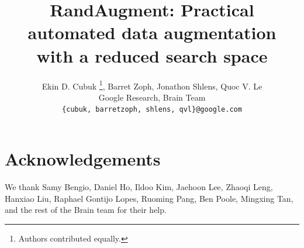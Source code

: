 \documentclass[10pt,twocolumn,letterpaper]{article}
\begin{document}
\title{RandAugment: Practical automated data augmentation\\ with a reduced search space}



\author{Ekin D. Cubuk \thanks{Authors contributed equally.}, Barret Zoph\footnotemark[1], Jonathon Shlens, Quoc V. Le  \\
Google Research, Brain Team\\
\texttt{\{cubuk, barretzoph, shlens, qvl\}@google.com}}

\maketitle








\section{Acknowledgements}
We thank Samy Bengio, Daniel Ho, Ildoo Kim, Jaehoon Lee, Zhaoqi Leng, Hanxiao Liu, Raphael Gontijo Lopes, Ruoming Pang, Ben Poole, Mingxing Tan, and the rest of the Brain team for their help.
\clearpage

% 
% 

{\small


}

\clearpage

\end{document}
